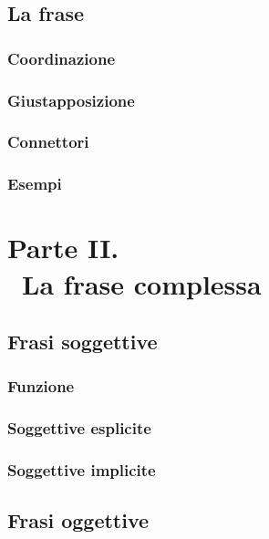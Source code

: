\documentclass[a4paper,twoside,11pt,chapterprefix=false,bibliography=totocnumbered,listof=flat]{scrbook}
\begin{document}
\chapter{La frase}\label{la-frase}

\section{Coordinazione}\label{coordinazione}

\section{Giustapposizione}\label{giustapposizione}

\section{Connettori}\label{connettori}

\section{Esempi}\label{esempi}

\part*{Parte II. \\\ La frase complessa}

\chapter{Frasi soggettive}\label{frasi-soggettive}

\section{Funzione}\label{funzione}

\section{Soggettive esplicite}\label{soggettive-esplicite}

\section{Soggettive implicite}\label{soggettive-implicite}

\chapter{Frasi oggettive}\label{frasi-oggettive}
\end{document}
